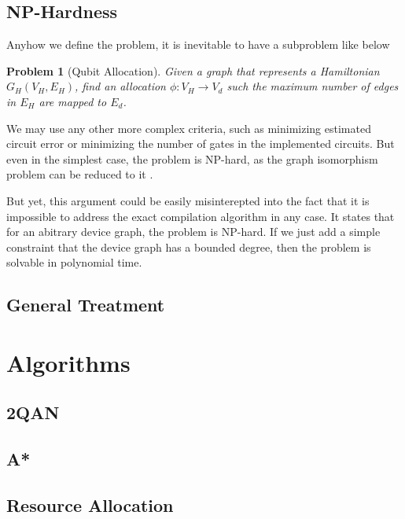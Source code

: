 \documentclass{article}
\newtheorem{prob}{Problem}
\begin{document}
  \subsection{NP-Hardness}
  Anyhow we define the problem, it is inevitable to have a subproblem like below

  \begin{prob}[Qubit Allocation]
    Given a graph that represents a Hamiltonian $G_H(V_H, E_H)$, find an allocation $\phi : V_H \to  V_d$ such the maximum number of edges in $E_H$ are mapped to $E_d$.
  \end{prob}

  We may use any other more complex criteria, such as minimizing estimated circuit error or minimizing the number of gates in the implemented circuits. But even in the simplest case, the problem is NP-hard, as the graph isomorphism problem can be reduced to it \cite{?}.

  But yet, this argument could be easily misinterepted into the fact that it is impossible to address the exact compilation algorithm in any case. It states that for an abitrary device graph, the problem is NP-hard. If we just add a simple constraint that the device graph has a bounded degree, then the problem is solvable in polynomial time. \cite{?}

  \subsection{General Treatment}
  
  \section{Algorithms}
  \subsection{2QAN}
  \subsection{A*}
  \subsection{Resource Allocation}
  
\printbibliography
\end{document}
